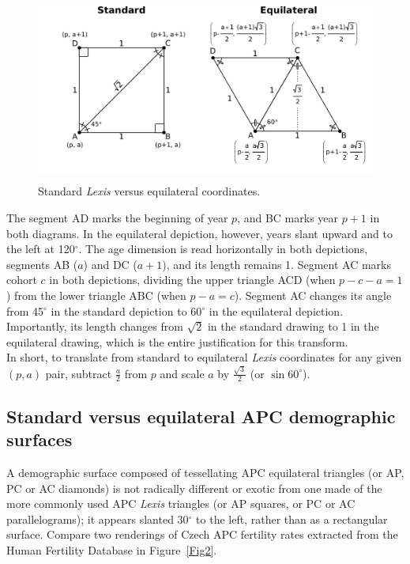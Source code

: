 \documentclass[a4paper]{article}
\begin{document}
\begin{figure}[ht!]
\centering
\includegraphics[width=12cm,height=6cm]{Figs/Figure1.pdf}
\caption{Standard \textit{Lexis} versus equilateral coordinates.}
\label{Fig1}
\end{figure}

The segment AD marks the beginning of year $p$, and BC marks year $p+1$ in both diagrams. In the equilateral depiction, however, years slant upward and to the left at 120$^\circ$. The age dimension is read horizontally in both depictions, segments AB ($a$) and DC ($a+1$), and its length remains 1. Segment AC marks cohort $c$ in both depictions, dividing the upper triangle ACD (when $p-c-a=1$) from the lower triangle ABC (when $p-a=c$). Segment AC changes its angle from 45$^\circ$ in the standard depiction to 60$^\circ$ in the equilateral depiction. Importantly, its length changes from $\sqrt{2}$ in the standard drawing to 1 in the equilateral drawing, which is the entire justification for this transform.\\ 

In short, to translate from standard to equilateral \textit{Lexis} coordinates for any given $(p,a)$ pair, subtract $\frac{a}{2}$ from $p$ and scale $a$ by $\frac{\sqrt{3}}{2}$ (or $\sin{60^\circ}$).

\subsection*{Standard versus equilateral APC demographic surfaces}
A demographic surface composed of tessellating APC equilateral triangles (or AP, PC or AC diamonds) is not radically different or exotic from one made of the more commonly used APC \textit{Lexis} triangles (or AP squares, or PC or AC parallelograms); it appears slanted 30$^\circ$ to the left, rather than as a rectangular surface. Compare two renderings of Czech APC fertility rates extracted from the Human Fertility Database  in Figure~\ref{Fig2}.\\
\end{document}
